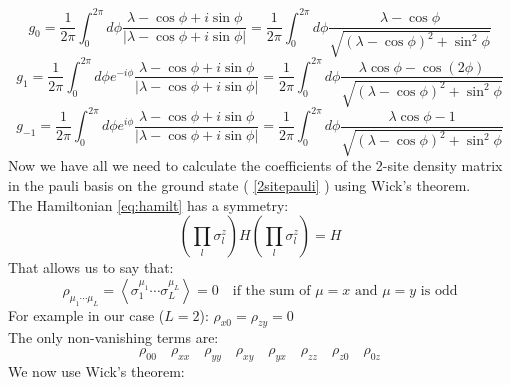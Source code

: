\documentclass[10pt,a4paper]{article}
\begin{document}
	\begin{equation}\label{eq:g0}
	g_0=\frac{1}{2 \pi} \int_{0}^{2 \pi} d \phi \frac{\lambda-\cos \phi+i \sin \phi}{|\lambda-\cos\phi +i  \sin \phi|}=\frac{1}{2 \pi} \int_{0}^{2 \pi} d \phi \frac{\lambda-\cos \phi}{\sqrt{(\lambda-\cos\phi)^2 +  \sin^2 \phi}}
	\end{equation}
	\begin{equation}\label{eq:g1}
	g_1=\frac{1}{2 \pi} \int_{0}^{2 \pi} d \phi e^{-i  \phi} \frac{\lambda-\cos \phi+i \sin \phi}{|\lambda-\cos\phi +i  \sin \phi|}=\frac{1}{2 \pi} \int_{0}^{2 \pi} d \phi \frac{\lambda\cos \phi-\cos(2\phi)}{\sqrt{(\lambda-\cos\phi)^2 +  \sin^2 \phi}}
	\end{equation}
		\begin{equation}\label{eq:gm1}
	g_{-1}=\frac{1}{2 \pi} \int_{0}^{2 \pi} d \phi e^{i  \phi} \frac{\lambda-\cos \phi+i \sin \phi}{|\lambda-\cos\phi +i  \sin \phi|}=\frac{1}{2 \pi} \int_{0}^{2 \pi} d \phi \frac{\lambda\cos \phi-1}{\sqrt{(\lambda-\cos\phi)^2 +  \sin^2 \phi}}
	\end{equation}
	Now we have all we need to calculate  the coefficients of the 2-site density matrix in the pauli basis on the ground state ( \ref{2sitepauli} ) using Wick's theorem.\\
	\newline
	The Hamiltonian \ref{eq:hamilt} has a symmetry:
	\begin{equation}\label{eq:symm}\left(\prod_{l} \sigma_{l}^{z}\right) H\left(\prod_{l} \sigma_{l}^{z}\right)=H\end{equation}
	That allows us to say that:
	\begin{equation}\rho_{\mu_{1}\cdots  \mu_{L}}=\left\langle\sigma_{1}^{\mu_{1}}\cdots  \sigma_{L}^{\mu_{L}}\right\rangle=0 \quad \text{if the sum of $\mu=x$ and $\mu=y$ is odd}\end{equation}
	For example in our case ($L=2$): $\rho_{x0}=\rho_{zy}=0$ \\
	The only non-vanishing terms are:
	\begin{equation}
	\rho_{00}\quad \rho_{xx} \quad \rho_{yy} \quad \rho_{xy} \quad \rho_{yx} \quad \rho_{zz}
	\quad \rho_{z0} \quad \rho_{0z}
	\end{equation}
	We now use Wick's theorem:
\end{document}
